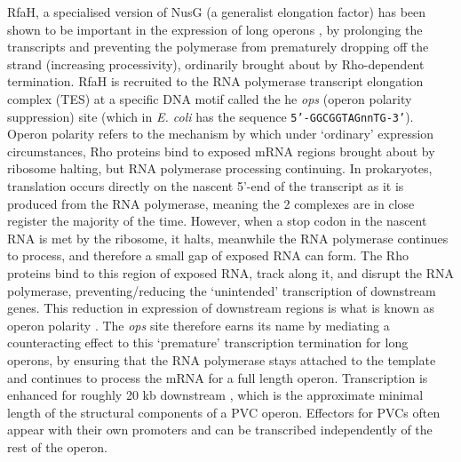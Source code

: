 RfaH, a specialised version of NusG (a generalist elongation factor) has been shown to be important in the expression of long operons \citep{Bailey1996}, by prolonging the transcripts and preventing the polymerase from prematurely dropping off the strand (increasing processivity), ordinarily brought about by Rho-dependent termination. RfaH is recruited to the RNA polymerase transcript elongation complex (TES) at a specific DNA motif called the he \emph{ops} (operon polarity suppression) site (which in \emph{E. coli} has the sequence \texttt{5'-GGCGGTAGnnTG-3'}). Operon polarity refers to the mechanism by which under `ordinary' expression circumstances, Rho proteins bind to exposed mRNA regions brought about by ribosome halting, but RNA polymerase processing continuing. In prokaryotes, translation occurs directly on the nascent 5'-end of the transcript as it is produced from the RNA polymerase, meaning the 2 complexes are in close register the majority of the time. However, when a stop codon in the nascent RNA is met by the ribosome, it halts, meanwhile the RNA polymerase continues to process, and therefore a small gap of exposed RNA can form. The Rho proteins bind to this region of exposed RNA, track along it, and disrupt the RNA polymerase, preventing/reducing the `unintended' transcription of downstream genes. This reduction in expression of downstream regions is what is known as operon polarity \citep{Santangelo2008, Adhya1974, Banerjee2006, Nudler2002}. The \emph{ops} site therefore earns its name by mediating a counteracting effect to this `premature' transcription termination for long operons, by ensuring that the RNA polymerase stays attached to the template and continues to process the mRNA for a full length operon. Transcription is enhanced for roughly 20 kb downstream \citep{Artsimovitch2002, Leeds1996, Leeds1997}, which is the approximate minimal length of the structural components of a PVC operon. Effectors for PVCs often appear with their own promoters and can be transcribed independently of the rest of the operon.

